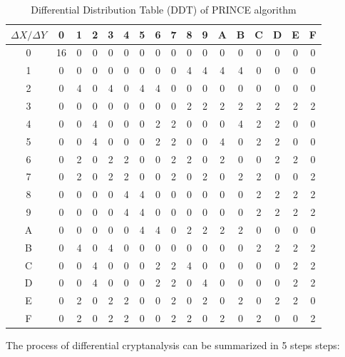 \begin{table}[h!]
\centering
\caption{Differential Distribution Table (DDT) of PRINCE algorithm}
\begin{tabular}{|c|c|c|c|c|c|c|c|c|c|c|c|c|c|c|c|c|}
\hhline{|=|=|=|=|=|=|=|=|=|=|=|=|=|=|=|=|=|}
$\Delta X / \Delta Y $ & 0 & 1 & 2 & 3 & 4 & 5 & 6 & 7 & 8 & 9 & A & B & C & D & E & F \\
\hline
0 & 16 & 0 & 0 & 0 & 0 & 0 & 0 & 0 & 0 & 0 & 0 & 0 & 0 & 0 & 0 & 0 \\
\hline
1 & 0 & 0 & 0 & 0 & 0 & 0 & 0 & 0 & 4 & 4 & 4 & 4 & 0 & 0 & 0 & 0 \\
\hline
2 & 0 & 4 & 0 & 4 & 0 & 4 & 4 & 0 & 0 & 0 & 0 & 0 & 0 & 0 & 0 & 0 \\
\hline
3 & 0 & 0 & 0 & 0 & 0 & 0 & 0 & 0 & 2 & 2 & 2 & 2 & 2 & 2 & 2 & 2 \\
\hline
4 & 0 & 0 & 4 & 0 & 0 & 0 & 2 & 2 & 0 & 0 & 0 & 4 & 2 & 2 & 0 & 0 \\
\hline
5 & 0 & 0 & 4 & 0 & 0 & 0 & 2 & 2 & 0 & 0 & 4 & 0 & 2 & 2 & 0 & 0 \\
\hline
6 & 0 & 2 & 0 & 2 & 2 & 0 & 0 & 2 & 2 & 0 & 2 & 0 & 0 & 2 & 2 & 0 \\
\hline
7 & 0 & 2 & 0 & 2 & 2 & 0 & 0 & 2 & 0 & 2 & 0 & 2 & 2 & 0 & 0 & 2 \\
\hline
8 & 0 & 0 & 0 & 0 & 4 & 4 & 0 & 0 & 0 & 0 & 0 & 0 & 2 & 2 & 2 & 2 \\
\hline
9 & 0 & 0 & 0 & 0 & 4 & 4 & 0 & 0 & 0 & 0 & 0 & 0 & 2 & 2 & 2 & 2 \\
\hline
A & 0 & 0 & 0 & 0 & 0 & 4 & 4 & 0 & 2 & 2 & 2 & 2 & 0 & 0 & 0 & 0 \\
\hline
B & 0 & 4 & 0 & 4 & 0 & 0 & 0 & 0 & 0 & 0 & 0 & 0 & 2 & 2 & 2 & 2 \\
\hline
C & 0 & 0 & 4 & 0 & 0 & 0 & 2 & 2 & 4 & 0 & 0 & 0 & 0 & 0 & 2 & 2 \\
\hline
D & 0 & 0 & 4 & 0 & 0 & 0 & 2 & 2 & 0 & 4 & 0 & 0 & 0 & 0 & 2 & 2 \\
\hline
E & 0 & 2 & 0 & 2 & 2 & 0 & 0 & 2 & 0 & 2 & 0 & 2 & 0 & 2 & 2 & 0 \\
\hline
F & 0 & 2 & 0 & 2 & 2 & 0 & 0 & 2 & 2 & 0 & 2 & 0 & 2 & 0 & 0 & 2 \\
\hline
\end{tabular}

\label{tbl:ddtprince}
\end{table}

The process of differential cryptanalysis can be summarized in 5 steps steps:

